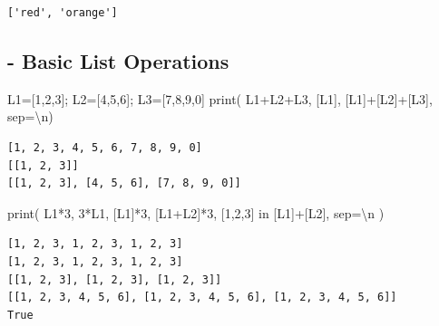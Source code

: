 \documentclass[
  a4paper,
  DIV=11,
  numbers=noendperiod]{scrreprt}
\newenvironment{Shaded}{\begin{snugshade}}{\end{snugshade}}
\newcommand{\BuiltInTok}[1]{\textcolor[rgb]{0.00,0.23,0.31}{#1}}
\newcommand{\CharTok}[1]{\textcolor[rgb]{0.13,0.47,0.30}{#1}}
\newcommand{\DecValTok}[1]{\textcolor[rgb]{0.68,0.00,0.00}{#1}}
\newcommand{\KeywordTok}[1]{\textcolor[rgb]{0.00,0.23,0.31}{#1}}
\newcommand{\NormalTok}[1]{\textcolor[rgb]{0.00,0.23,0.31}{#1}}
\newcommand{\OperatorTok}[1]{\textcolor[rgb]{0.37,0.37,0.37}{#1}}
\newcommand{\StringTok}[1]{\textcolor[rgb]{0.13,0.47,0.30}{#1}}
\begin{document}
\begin{verbatim}
['red', 'orange']
\end{verbatim}

\subsection{- Basic List Operations}\label{basic-list-operations}

\begin{Shaded}
\begin{Highlighting}[]
\NormalTok{L1}\OperatorTok{=}\NormalTok{[}\DecValTok{1}\NormalTok{,}\DecValTok{2}\NormalTok{,}\DecValTok{3}\NormalTok{]}\OperatorTok{;}\NormalTok{ L2}\OperatorTok{=}\NormalTok{[}\DecValTok{4}\NormalTok{,}\DecValTok{5}\NormalTok{,}\DecValTok{6}\NormalTok{]}\OperatorTok{;}\NormalTok{ L3}\OperatorTok{=}\NormalTok{[}\DecValTok{7}\NormalTok{,}\DecValTok{8}\NormalTok{,}\DecValTok{9}\NormalTok{,}\DecValTok{0}\NormalTok{]}
\BuiltInTok{print}\NormalTok{(}
\NormalTok{    L1}\OperatorTok{+}\NormalTok{L2}\OperatorTok{+}\NormalTok{L3,}
\NormalTok{    [L1],}
\NormalTok{    [L1]}\OperatorTok{+}\NormalTok{[L2]}\OperatorTok{+}\NormalTok{[L3],}
\NormalTok{    sep}\OperatorTok{=}\StringTok{\textquotesingle{}}\CharTok{\textbackslash{}n}\StringTok{\textquotesingle{}}\NormalTok{)}
\end{Highlighting}
\end{Shaded}

\begin{verbatim}
[1, 2, 3, 4, 5, 6, 7, 8, 9, 0]
[[1, 2, 3]]
[[1, 2, 3], [4, 5, 6], [7, 8, 9, 0]]
\end{verbatim}

\begin{Shaded}
\begin{Highlighting}[]
\BuiltInTok{print}\NormalTok{(}
\NormalTok{    L1}\OperatorTok{*}\DecValTok{3}\NormalTok{,}
    \DecValTok{3}\OperatorTok{*}\NormalTok{L1,}
\NormalTok{    [L1]}\OperatorTok{*}\DecValTok{3}\NormalTok{,}
\NormalTok{    [L1}\OperatorTok{+}\NormalTok{L2]}\OperatorTok{*}\DecValTok{3}\NormalTok{,}
\NormalTok{    [}\DecValTok{1}\NormalTok{,}\DecValTok{2}\NormalTok{,}\DecValTok{3}\NormalTok{] }\KeywordTok{in}\NormalTok{ [L1]}\OperatorTok{+}\NormalTok{[L2],}
\NormalTok{    sep}\OperatorTok{=}\StringTok{\textquotesingle{}}\CharTok{\textbackslash{}n}\StringTok{\textquotesingle{}}
\NormalTok{)}
\end{Highlighting}
\end{Shaded}

\begin{verbatim}
[1, 2, 3, 1, 2, 3, 1, 2, 3]
[1, 2, 3, 1, 2, 3, 1, 2, 3]
[[1, 2, 3], [1, 2, 3], [1, 2, 3]]
[[1, 2, 3, 4, 5, 6], [1, 2, 3, 4, 5, 6], [1, 2, 3, 4, 5, 6]]
True
\end{verbatim}
\end{document}
